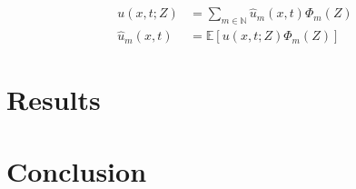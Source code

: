 \documentclass[12pt]{article}
\begin{document}
\begin{align*}
    u(x,t;Z) &= \sum_{m\in\mathbb{N}}\hat{u}_m(x,t)\Phi_m(Z)\\
    \hat{u}_m(x,t) &= \mathbb{E}[u(x,t;Z)\Phi_m(Z)]
\end{align*}
\section{Results}

\section{Conclusion}

\printbibliography
\end{document}
